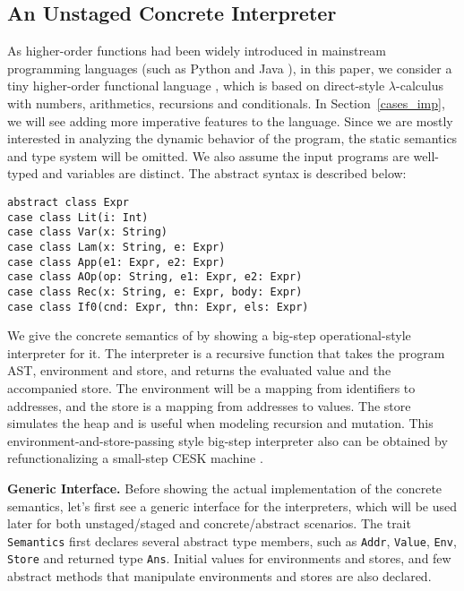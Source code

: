 \subsection{An Unstaged Concrete Interpreter} \label{bg_lang}

As higher-order functions had been widely introduced in mainstream programming languages (such as Python and Java ), 
in this paper, we consider a tiny higher-order functional language \TLang, which is based on direct-style $\lambda$-calculus
with numbers, arithmetics, recursions and conditionals.
In Section~\ref{cases_imp}, we will see adding more imperative features to the language.
Since we are mostly interested in analyzing the dynamic behavior of the program, the static semantics and
type system will be omitted. We also assume the input programs are well-typed and variables are distinct.
The abstract syntax is described below:

\begin{lstlisting}
abstract class Expr
case class Lit(i: Int)
case class Var(x: String)
case class Lam(x: String, e: Expr)
case class App(e1: Expr, e2: Expr)
case class AOp(op: String, e1: Expr, e2: Expr)
case class Rec(x: String, e: Expr, body: Expr)
case class If0(cnd: Expr, thn: Expr, els: Expr)
\end{lstlisting}

We give the concrete semantics of \TLang by showing a big-step operational-style interpreter for it.
The interpreter is a recursive function that takes the program AST, environment and store, and returns 
the evaluated value and the accompanied store. The environment will be a mapping from identifiers to addresses,
and the store is a mapping from addresses to values. The store simulates the heap and is useful when modeling 
recursion and mutation.
This environment-and-store-passing style big-step interpreter also can be obtained by 
refunctionalizing \cite{DBLP:conf/ppdp/AgerBDM03, Wei:2018:RAA:3243631.3236800} a small-step CESK 
machine \cite{DBLP:conf/popl/FelleisenF87}.

\textbf{Generic Interface.} Before showing the actual implementation of the concrete semantics, let's first see 
a generic interface for the interpreters, which will be used later for both unstaged/staged and concrete/abstract scenarios.
The trait \texttt{Semantics} first declares several abstract type members, such as \texttt{Addr},
\texttt{Value}, \texttt{Env}, \texttt{Store} and returned type \texttt{Ans}. 
Initial values for environments and stores, and few abstract methods that manipulate environments and stores are also declared.

